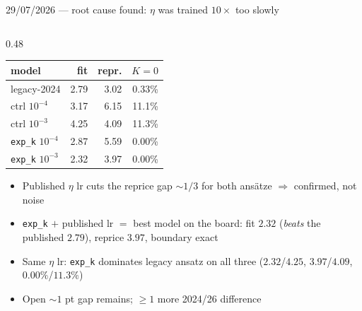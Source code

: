 \documentclass[aspectratio=169,11pt]{beamer}
\newcommand{\gold}[1]{{\color{ntugold}#1}}
\newcommand{\red}[1]{{\color{ntured}#1}}
\begin{document}
\begin{frame}{29/07/2026 --- root cause found: $\eta$ was trained $10\times$ too slowly}
\begin{columns}[T]
\begin{column}{0.48\linewidth}
      \vspace{0.15cm}
      \begin{center}\scriptsize
      \begin{tabular}{lrrr}
        \toprule
        model & fit & repr. & $K{=}0$ \\
        \midrule
        legacy-2024 & 2.79 & \gold{3.02} & 0.33\% \\
        \midrule
        ctrl $10^{-4}$  & 3.17 & 6.15 & 11.1\% \\
        ctrl $10^{-3}$  & 4.25 & \gold{4.09} & 11.3\% \\
        \midrule
        \texttt{exp\_k} $10^{-4}$ & 2.87 & 5.59 & 0.00\% \\
        \texttt{exp\_k} $10^{-3}$ & \red{2.32} & \red{3.97} & \red{0.00\%} \\
        \bottomrule
      \end{tabular}
      \end{center}
      \vspace{0.1cm}
      \begin{itemize}\scriptsize
        \item Published $\eta$ lr cuts the reprice gap $\sim\!1/3$ for \gold{both} ansätze
              $\Rightarrow$ confirmed, not noise
        \item \texttt{exp\_k} $+$ published lr $=$ \red{best model on the board}: fit $2.32$
              (\emph{beats} the published $2.79$), reprice $3.97$, boundary exact
        \item Same $\eta$ lr: \texttt{exp\_k} dominates legacy ansatz on all three
              ($2.32$/$4.25$, $3.97$/$4.09$, $0.00\%$/$11.3\%$)
        \item \gold{Open} $\sim\!1$ pt gap remains; $\ge1$ more 2024/26 difference
      \end{itemize}
    \end{column}
  \end{columns}
\end{frame}

\end{document}
